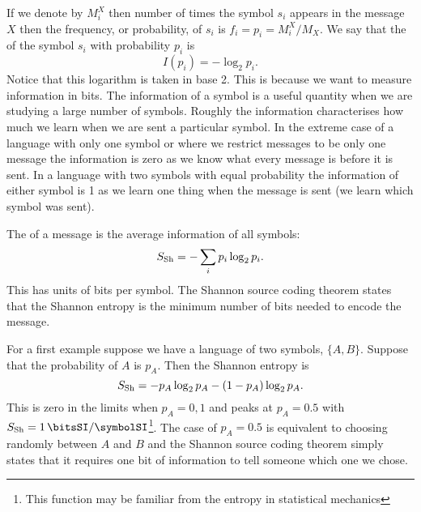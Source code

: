     If we denote by \(M_i^X\) then number of times the symbol \(s_i\) appears in the message \(X\) then the frequency, or probability, of \(s_i\) is \(f_i = p_i = M_i^X/M_X\).
    We say that the  of the symbol \(s_i\) with probability \(p_i\) is
    \[I(p_i) = -\log_2p_i.\]
    Notice that this logarithm is taken in base 2.
    This is because we want to measure information in bits.
    The information of a symbol is a useful quantity when we are studying a large number of symbols.
    Roughly the information characterises how much we learn when we are sent a particular symbol.
    In the extreme case of a language with only one symbol or where we restrict messages to be only one message the information is zero as we know what every message is before it is sent.
    In a language with two symbols with equal probability the information of either symbol is 1 as we learn one thing when the message is sent (we learn which symbol was sent).
    
    The  of a message is the average information of all symbols:
    \[S_{\mathrm{Sh}} = -\sum_i p_i\log_2 p_i.\]
    This has units of bits per symbol.
    The Shannon source coding theorem states that the Shannon entropy is the minimum number of bits needed to encode the message.
    
    For a first example suppose we have a language of two symbols, \(\{A, B\}\).
    Suppose that the probability of \(A\) is \(p_A\).
    Then the Shannon entropy is
    \[S_{\mathrm{Sh}} = -p_A\log_2p_A - (1 - p_A)\log_2p_A.\]
    This is zero in the limits when \(p_A = 0, 1\) and peaks at \(p_A = 0.5\) with \(\shannonEntropy = \SI{1}{\bitsSI/\symbolSI}\)\footnote{This function may be familiar from the entropy in statistical mechanics}.
    The case of \(p_A = 0.5\) is equivalent to choosing randomly between \(A\) and \(B\) and the Shannon source coding theorem simply states that it requires one bit of information to tell someone which one we chose.
    

